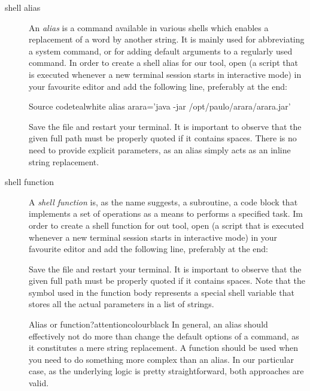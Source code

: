\begin{description}
\item[shell alias] An \emph{alias} is a command available in various shells which enables a replacement of a word by another string. It is mainly used for abbreviating a system command, or for adding default arguments to a regularly used command. In order to create a shell alias for our tool, open  (a script that is executed whenever a new terminal session starts in interactive mode) in your favourite editor and add the following line, preferably at the end:

\begin{codebox}{Source code}{teal}{\icnote}{white}
alias arara='java -jar /opt/paulo/arara/arara.jar'
\end{codebox}

Save the file and restart your terminal. It is important to observe that the given full path must be properly quoted if it contains spaces. There is no need to provide explicit parameters, as an alias simply acts as an inline string replacement.

\item[shell function] A \emph{shell function} is, as the name suggests, a subroutine, a code block that implements a set of operations as a means to performs a specified task. Im order to create a shell function for out tool, open  (a script that is executed whenever a new terminal session starts in interactive mode) in your favourite editor and add the following line, preferably at the end:


Save the file and restart your terminal. It is important to observe that the given full path must be properly quoted if it contains spaces. Note that the  symbol used in the function body represents a special shell variable that stores all the actual parameters in a list of strings.

\begin{messagebox}{Alias or function?}{attentioncolour}{\icattention}{black}
In general, an alias should effectively not do more than change the default options of a command, as it constitutes a mere string replacement. A function should be used when you need to do something more complex than an alias. In our particular case, as the underlying logic is pretty straightforward, both approaches are valid.
\end{messagebox}


\end{description}
